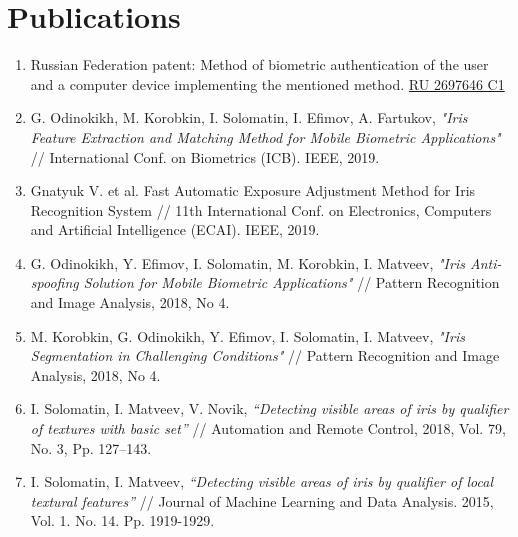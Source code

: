\documentclass[a4paper,10pt]{article}
\begin{document}
\section{Publications}
\begin{enumerate}
\item Russian Federation patent: Method of biometric authentication of the user and a computer device implementing the mentioned method. \href{http://new.fips.ru/publication-web/publications/document?type=doc&tab=IZPM&id=563975E5-21C6-42F2-A023-1485D06562B6}{RU 2697646 C1}
\item G. Odinokikh, M. Korobkin, I. Solomatin, I. Efimov, A. Fartukov, \textit{"Iris Feature Extraction and Matching Method for Mobile Biometric Applications"} // International Conf. on Biometrics (ICB). IEEE, 2019.
\item Gnatyuk V. et al. Fast Automatic Exposure Adjustment Method for Iris Recognition System // 11th International Conf. on Electronics, Computers and Artificial Intelligence (ECAI). IEEE, 2019.
\item G. Odinokikh, Y. Efimov, I. Solomatin, M. Korobkin, I. Matveev, \textit{"Iris Anti-spoofing Solution for Mobile Biometric Applications"} // Pattern Recognition and Image Analysis, 2018, No 4.
\item M. Korobkin, G. Odinokikh, Y. Efimov, I. Solomatin, I. Matveev, \textit{"Iris Segmentation in Challenging Conditions"} // Pattern Recognition and Image Analysis, 2018, No 4.
\item I. Solomatin, I. Matveev, V. Novik, \textit{“Detecting visible areas of iris by qualifier of
textures with basic set”} // Automation and Remote Control, 2018, Vol. 79, No. 3, Pp. 127–143.
\item I. Solomatin, I. Matveev, \textit{“Detecting visible areas of iris by qualifier of local textural
features”} // Journal of Machine Learning and Data Analysis. 2015, Vol. 1. No. 14. Pp. 1919-1929.
\end{enumerate}
\end{document}
